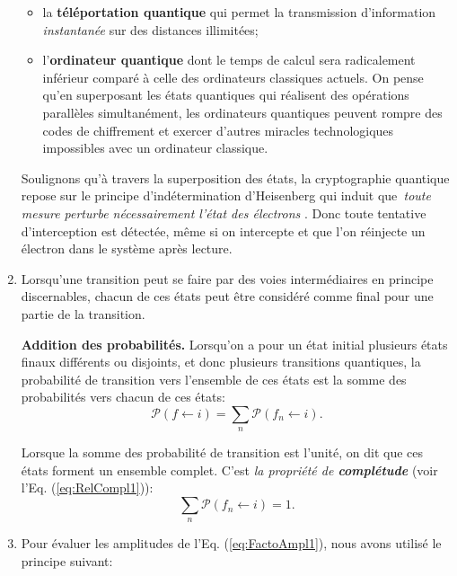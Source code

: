 \begin{enumerate}
\begin{itemize}
\item la \textbf{téléportation quantique} qui permet la transmission
d'information \emph{instantanée} sur des distances illimitées;

\item l'\textbf{ordinateur quantique} dont le temps de calcul sera
radicalement inférieur comparé à celle des ordinateurs classiques actuels. On
pense qu'en superposant les états quantiques qui réalisent des opérations
parallèles simultanément, les ordinateurs quantiques peuvent rompre des codes
de chiffrement et exercer d'autres miracles technologiques impossibles avec un
ordinateur classique.
\end{itemize}

Soulignons qu'à travers la superposition des états, la cryptographie
quantique repose sur le principe d'indétermination d'Heisenberg qui induit
que\emph{\ toute mesure perturbe nécessairement l'état des électrons }. Donc
toute tentative d'interception est détectée, même si on intercepte et que l'on
réinjecte un électron dans le système après lecture.

\item Lorsqu'une transition peut se faire par des voies intermédiaires en
principe discernables, chacun de ces états peut être considéré comme final
pour une partie de la transition.

\colorbox[gray]{0.8}{
\parbox[c]{0.9\textwidth}{
\begin{principe}
\textbf{Addition des probabilités.} Lorsqu'on a pour un état initial plusieurs
états finaux différents ou disjoints, et donc plusieurs transitions quantiques,
la probabilité de transition vers l'ensemble de ces états est  la somme des
probabilités vers chacun de ces états:
\begin{equation}
\mathcal{P}(f\leftarrow i)=\sum_{n}\mathcal{P}(f_{n}\leftarrow i).
\end{equation}
\end{principe}
}}

Lorsque la somme des probabilité de transition est l'unité, on dit que ces
états forment un ensemble complet. C'est \emph{la propriété de
\textbf{complétude}} (voir l'Eq. (\ref{eq:RelCompl1})):%
\begin{equation}
\sum_{n}\mathcal{P}(f_{n}\leftarrow i)=1.
\end{equation}


\item Pour évaluer les amplitudes de l'Eq. (\ref{eq:FactoAmpl1}), nous avons
utilisé le principe suivant:


\end{enumerate}
